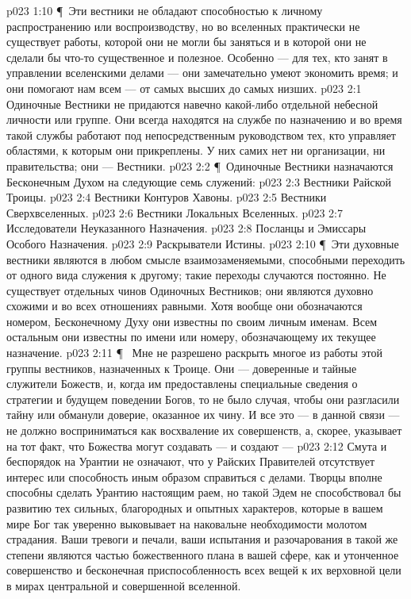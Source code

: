 \vs p023 1:10 \P\ Эти вестники не обладают способностью к личному распространению или воспроизводству, но во вселенных практически не существует работы, которой они не могли бы заняться и в которой они не сделали бы что\hyp{}то существенное и полезное. Особенно --- для тех, кто занят в управлении вселенскими делами --- они замечательно умеют экономить время; и они помогают нам всем --- от самых высших до самых низших.
\vs p023 2:1 Одиночные Вестники не придаются навечно какой\hyp{}либо отдельной небесной личности или группе. Они всегда находятся на службе по назначению и во время такой службы работают под непосредственным руководством тех, кто управляет областями, к которым они прикреплены. У них самих нет ни организации, ни правительства; они ---  Вестники.
\vs p023 2:2 \P\ Одиночные Вестники назначаются Бесконечным Духом на следующие семь служений:
\vs p023 2:3 \bibnobreakspace Вестники Райской Троицы.
\vs p023 2:4 \bibnobreakspace Вестники Контуров Хавоны.
\vs p023 2:5 \bibnobreakspace Вестники Сверхвселенных.
\vs p023 2:6 \bibnobreakspace Вестники Локальных Вселенных.
\vs p023 2:7 \bibnobreakspace Исследователи Неуказанного Назначения.
\vs p023 2:8 \bibnobreakspace Посланцы и Эмиссары Особого Назначения.
\vs p023 2:9 \bibnobreakspace Раскрыватели Истины.
\vs p023 2:10 \P\ Эти духовные вестники являются в любом смысле взаимозаменяемыми, способными переходить от одного вида служения к другому; такие переходы случаются постоянно. Не существует отдельных чинов Одиночных Вестников; они являются духовно схожими и во всех отношениях равными. Хотя вообще они обозначаются номером, Бесконечному Духу они известны по своим личным именам. Всем остальным они известны по имени или номеру, обозначающему их текущее назначение.
\vs p023 2:11 \P\ \bibnobreakspace {} Мне не разрешено раскрыть многое из работы этой группы вестников, назначенных к Троице. Они --- доверенные и тайные служители Божеств, и, когда им предоставлены специальные сведения о стратегии и будущем поведении Богов, то не было случая, чтобы они разгласили тайну или обманули доверие, оказанное их чину. И все это --- в данной связи --- не должно восприниматься как восхваление их совершенств, а, скорее, указывает на тот факт, что Божества могут создавать --- и создают --- 
\vs p023 2:12 Смута и беспорядок на Урантии не означают, что у Райских Правителей отсутствует интерес или способность иным образом справиться с делами. Творцы вполне способны сделать Урантию настоящим раем, но такой Эдем не способствовал бы развитию тех сильных, благородных и опытных характеров, которые в вашем мире Бог так уверенно выковывает на наковальне необходимости молотом страдания. Ваши тревоги и печали, ваши испытания и разочарования в такой же степени являются частью божественного плана в вашей сфере, как и утонченное совершенство и бесконечная приспособленность всех вещей к их верховной цели в мирах центральной и совершенной вселенной.
